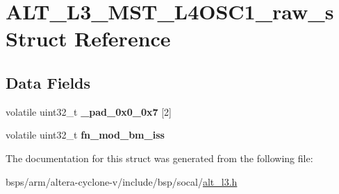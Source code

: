 \hypertarget{structALT__L3__MST__L4OSC1__raw__s}{}\section{A\+L\+T\+\_\+\+L3\+\_\+\+M\+S\+T\+\_\+\+L4\+O\+S\+C1\+\_\+raw\+\_\+s Struct Reference}
\label{structALT__L3__MST__L4OSC1__raw__s}
\subsection*{Data Fields}
\begin{DoxyCompactItemize}
\item 
\mbox{\label{structALT__L3__MST__L4OSC1__raw__s_ab30073a09ca7b708831cf0b1cc77270e}} 
volatile uint32\+\_\+t {\bfseries \+\_\+pad\+\_\+0x0\+\_\+0x7} \mbox{[}2\mbox{]}
\item 
\mbox{\label{structALT__L3__MST__L4OSC1__raw__s_a062fc99ef0bee5376107edd92ed84e80}} 
volatile uint32\+\_\+t {\bfseries fn\+\_\+mod\+\_\+bm\+\_\+iss}
\end{DoxyCompactItemize}


The documentation for this struct was generated from the following file\+:\begin{DoxyCompactItemize}
\item 
bsps/arm/altera-\/cyclone-\/v/include/bsp/socal/\mbox{\hyperlink{alt__l3_8h}{alt\+\_\+l3.\+h}}\end{DoxyCompactItemize}
